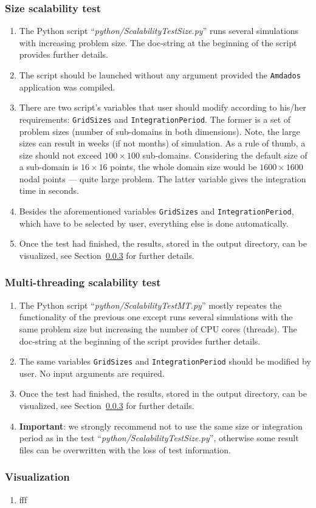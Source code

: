 \documentclass[]{article}
\begin{document}
\subsubsection{Size scalability test}
\begin{enumerate}
\item The Python script ``\textit{python/ScalabilityTestSize.py}'' runs several simulations with increasing problem size. The doc-string at the beginning of the script provides further details.
\item The script should be launched without any argument provided the \texttt{Amdados} application was compiled.
\item There are two script's variables that user should modify according to his/her requirements: \texttt{GridSizes} and \texttt{IntegrationPeriod}. The former is a set of problem sizes (number of sub-domains in both dimensions). Note, the large sizes can result in weeks (if not months) of simulation. As a rule of thumb, a size should not exceed $100{\times}100$ sub-domains. Considering the default size of a sub-domain is $16{\times}16$ points, the whole domain size would be $1600{\times}1600$ nodal points --- quite large problem. The latter variable gives the integration time in seconds.
\item Besides the aforementioned variables \texttt{GridSizes} and \texttt{IntegrationPeriod}, \newline which have to be selected by user, everything else is done automatically.
\item Once the test had finished, the results, stored in the output directory, can be visualized, see Section~\ref{sec:visual} for further details.
\end{enumerate}

\subsubsection{Multi-threading scalability test}
\begin{enumerate}
\item The Python script ``\textit{python/ScalabilityTestMT.py}'' mostly repeates the functionality of the previous one except runs several simulations with the same problem size but increasing the number of CPU cores (threads). The doc-string at the beginning of the script provides further details.
\item The same variables \texttt{GridSizes} and \texttt{IntegrationPeriod} should be modified by user. No input arguments are required.
\item Once the test had finished, the results, stored in the output directory, can be visualized, see Section~\ref{sec:visual} for further details.
\item \textbf{Important}: we strongly recommend not to use the same size or integration period as in the test ``\textit{python/ScalabilityTestSize.py}'', otherwise some result files can be overwritten with the loss of test information.
\end{enumerate}

\subsubsection{Visualization}\label{sec:visual}
\begin{enumerate}
    \item fff
\end{enumerate}
\end{document}
